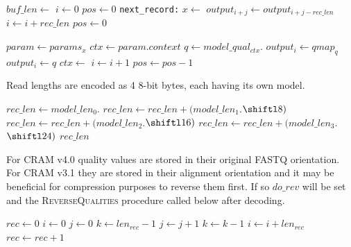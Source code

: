 \documentclass[a4paper]{article}
\begin{document}
\begin{algorithmic}[1]
  \State $buf\_len \gets$ 
  \State {}
  \State {}
  \State $i \gets 0$
  \State $pos \gets 0$
  \Label \texttt{next\_record:}
      \State $x \gets $
          \State $output_{i+j} \gets output_{i+j-rec\_len}$
        \EndFor
        \State $i \gets i+rec\_len$
        \State $pos \gets 0$
        \State {}
      \EndIf

      \Statex
      \State $param \gets params_x$
      \State $ctx \gets param.context$
    \EndIf
    \Statex
    \State $q \gets model\_qual_{ctx}.$
      \State $output_i \gets qmap_q$
    \Else
      \State $output_i \gets q$
    \EndIf
    \Statex
    \State $ctx \gets $
    \Statex
    \State $i \gets i + 1$
    \State $pos \gets pos - 1$
  \EndWhile
    \State {}
  \EndIf
\EndProcedure
\end{algorithmic}

Read lengths are encoded as 4 8-bit bytes, each having its own model.

\begin{algorithmic}[1]
\Statex
{}
\State $rec\_len \gets model\_len_0.$
\State $rec\_len \gets rec\_len + (model\_len_1.$$ \shiftl 8)$
\State $rec\_len \gets rec\_len + (model\_len_2.$$ \shiftl 16)$
\State $rec\_len \gets rec\_len + (model\_len_3.$$ \shiftl 24)$
\State \Return $rec\_len$
\EndFunction
\end{algorithmic}

For CRAM v4.0 quality values are stored in their original FASTQ
orientation.  For CRAM v3.1 they are stored in their alignment
orientation and it may be beneficial for compression purposes to
reverse them first.  If so $do\_rev$ will be set and the
\textsc{ReverseQualities} procedure called below after decoding.

\begin{algorithmic}[1]
\Statex
{}
\State $rec \gets 0$
\State $i \gets 0$
    \State $j \gets 0$
    \State $k \gets len_{rec}-1$
      \State {}
      \State $j \gets j+1$
      \State $k \gets k-1$
    \EndWhile
    \State $i \gets i + len_{rec}$
    \State $rec \gets rec+1$
  \EndIf
\EndWhile
\EndProcedure
\end{algorithmic}
\end{document}
